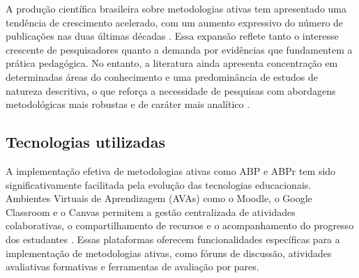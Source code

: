 A produção científica brasileira sobre metodologias ativas tem apresentado uma tendência de crescimento acelerado, com um aumento expressivo do número de publicações nas duas últimas décadas \cite{SANTOS2024}. Essa expansão reflete tanto o interesse crescente de pesquisadores quanto a demanda por evidências que fundamentem a prática pedagógica. No entanto, a literatura ainda apresenta concentração em determinadas áreas do conhecimento e uma predominância de estudos de natureza descritiva, o que reforça a necessidade de pesquisas com abordagens metodológicas mais robustas e de caráter mais analítico \cite{RIBEIRO2025}.

\subsection{Tecnologias utilizadas}
\label{subsec:tecno_utilizadas}

A implementação efetiva de metodologias ativas como ABP e ABPr tem sido significativamente facilitada pela evolução das tecnologias educacionais. Ambientes Virtuais de Aprendizagem (AVAs) como o Moodle, o Google Classroom e o Canvas permitem a gestão centralizada de atividades colaborativas, o compartilhamento de recursos e o acompanhamento do progresso dos estudantes \cite{MEZZARI2011}. Essas plataformas oferecem funcionalidades específicas para a implementação de metodologias ativas, como fóruns de discussão, atividades avaliativas formativas e ferramentas de avaliação por pares.

